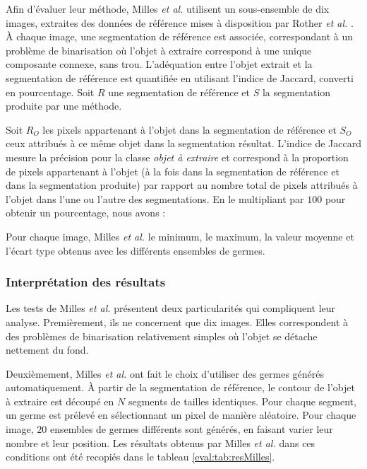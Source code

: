 Afin d'évaluer leur méthode, Milles \textit{et al.} utilisent un sous-ensemble de dix images, extraites des données de référence mises à disposition par  Rother \textit{et al.} \cite{rother2004grabcut}. À chaque image, une segmentation de référence est associée, correspondant à un problème de binarisation où l'objet à extraire correspond à une unique composante connexe, sans trou. L'adéquation entre l'objet extrait et la segmentation de référence est quantifiée en utilisant l'indice de Jaccard, converti en pourcentage. Soit $R$ une segmentation de référence et $S$ la segmentation produite par une méthode. 

Soit $R_{O}$ les pixels appartenant à l'objet dans la segmentation de référence et $S_{O}$ ceux attribués à ce même objet dans la segmentation résultat. L'indice de Jaccard mesure la précision pour la classe \emph{objet à extraire} et correspond à la proportion de pixels appartenant à l'objet (à la fois dans la segmentation de référence et dans la segmentation produite) par rapport au nombre total de pixels attribués à l'objet dans l'une ou l'autre des segmentations. En le multipliant par $100$ pour obtenir un pourcentage, nous avons :

Pour chaque image, Milles \textit{et al.}  le minimum, le maximum, la valeur moyenne et l'écart type obtenus avec les différents ensembles de germes. 

\subsubsection{Interprétation des résultats}

Les tests de Milles \textit{et al.} présentent deux particularités qui compliquent leur analyse. Premièrement, ils ne concernent que dix images. Elles correspondent à des problèmes de binarisation relativement simples où l'objet se détache nettement du fond.

Deuxièmement, Milles \textit{et al.} ont fait le choix d'utiliser des germes générés automatiquement. À partir de la segmentation de référence,  le contour de l'objet à extraire est découpé en $N$ segments de tailles identiques. Pour chaque segment, un germe est prélevé en sélectionnant un pixel de manière aléatoire. Pour chaque image, $20$ ensembles de germes différents sont générés, en faisant varier leur nombre et leur position. Les résultats obtenus par Milles \textit{et al.} dans ces conditions ont été recopiés dans le tableau \ref{eval:tab:resMilles}.


